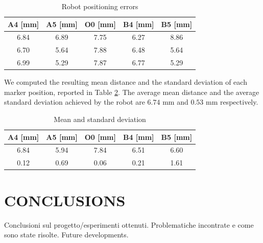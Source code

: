 \documentclass[letterpaper, 10 pt, conference]{ieeeconf}  %
\begin{document}
\begin{table}[h]
\begin{center}
\caption{Robot positioning errors}
\label{tab:laser}
\begin{tabular}{|c||c||c||c||c|}
\hline
\textbf{A4 [mm]} & \textbf{A5 [mm]} & \textbf{O0 [mm]} & \textbf{B4 [mm]} & \textbf{B5 [mm]} \\
\hline
6.84 & 6.89 & 7.75 & 6.27 & 8.86 \\
6.70 & 5.64 & 7.88 & 6.48 & 5.64\\
6.99 & 5.29 & 7.87 & 6.77 & 5.29\\
\hline
\end{tabular}
\end{center}
\end{table}

We computed the resulting mean distance and the standard deviation of each marker position, reported in Table \ref{tab:mean}. The average mean distance and the average standard deviation achieved by the robot are $6.74$ mm and $0.53$ mm respectively.

\begin{table}[h]
\begin{center}
\caption{Mean and standard deviation}
\label{tab:mean}
\begin{tabular}{|c||c||c||c||c|}
\hline
\textbf{A4 [mm]} & \textbf{A5 [mm]} & \textbf{O0 [mm]} & \textbf{B4 [mm]} & \textbf{B5 [mm]} \\
\hline
6.84 & 5.94 & 7.84 & 6.51 & 6.60 \\
0.12 & 0.69 & 0.06 & 0.21 & 1.61 \\
\hline
\end{tabular}
\end{center}
\end{table}

\section{CONCLUSIONS}

Conclusioni sul progetto/esperimenti ottenuti.
Problematiche incontrate e come sono state risolte.
Future developments.

\addtolength{\textheight}{-12cm}   %



\end{document}
